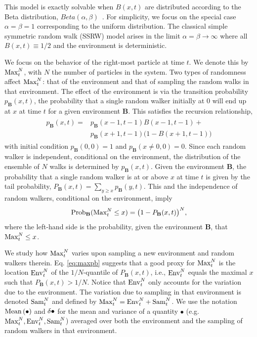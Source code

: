 This model is exactly solvable when $B(x,t)$ are distributed according to the Beta distribution, $Beta(\alpha, \beta)$~\cite{barraquandRandomwalkBetadistributedRandom2017a}. For simplicity, we focus on the special case $\alpha=\beta=1$ corresponding to the uniform distribution. The classical simple symmetric random walk (SSRW) model arises in the limit $\alpha=\beta\to \infty$ where all $B(x,t)\equiv 1/2$ and the environment is deterministic.

We focus on the behavior of the right-most particle at time $t$. We denote this by $\mathrm{Max}^{N}_t$, with $N$ the number of particles in the system. Two types of randomness affect $\mathrm{Max}^{N}_t$: that of the environment and that of sampling the random walks in that environment. The effect of the environment is via the transition probability $p_{\mathbf{B}}(x,t)$, the probability that a single random walker initially at $0$ will end up at $x$ at time $t$ for a given environment $\mathbf{B}$. This satisfies the recursion relationship, %
%
\begin{align} \label{eq:kolmogorov}
 \begin{split}
  p_{\mathbf{B}}(x,t) = & p_{\mathbf{B}}(x-1,t-1)B(x-1,t-1) +\\
  & p_{\mathbf{B}}(x+1,t-1)\big(1-B(x+1,t-1)\big)
 \end{split}
\end{align}
%
with initial condition $p_{\mathbf{B}}(0,0) = 1$ and $p_{\mathbf{B}}(x \neq 0,0) = 0$. Since each random walker is independent, conditional on the environment, the distribution of the ensemble of $N$ walks is determined by $p_{\mathbf{B}}(x,t)$. Given the environment $\mathbf{B}$, the probability that a single random walker is at or above $x$ at time $t$ is given by the tail probability, $P_{\mathbf{B}}(x,t) = \sum_{y\geq x} p_{\mathbf{B}}(y,t)$. This and the independence of random walkers, conditional on the environment, imply
%
\begin{equation}\label{eq:maxpb}
\mathrm{Prob}_{\mathbf{B}}(\mathrm{Max}^{N}_t \leq x) = \big(1-P_{\mathbf{B}}(x,t)\big)^N,
\end{equation}
%
where the left-hand side is the probability, given the environment $\mathbf{B}$, that $\mathrm{Max}^{N}_t \leq x$.

We study how $\mathrm{Max}^{N}_t$ varies upon sampling a new environment and random walkers therein. Eq. \eqref{eq:maxpb} suggests that a good proxy for $\mathrm{Max}^{N}_t$ is the location $\mathrm{Env}^{N}_t$ of the $1/N$-quantile of $P_{\mathbf{B}}(x,t)$, i.e., $\mathrm{Env}^{N}_t$ equals the maximal $x$ such that $P_{\mathbf{B}}(x,t)>1/N$. Notice that $\mathrm{Env}^{N}_t$ only accounts for the variation due to the environment. The variation due to sampling in that environment is denoted $\mathrm{Sam}^{N}_t$ and defined by $\mathrm{Max}^{N}_t = \mathrm{Env}^{N}_t + \mathrm{Sam}^{N}_t$. We use the notation $\mathrm{Mean}\left(\bullet\right)$ and $\var{\bullet}$ for the mean and variance of a quantity $\bullet$ (e.g. $\mathrm{Max}^{N}_t, \mathrm{Env}^{N}_t,\mathrm{Sam}^{N}_t$) averaged over both the environment and the sampling of random walkers in that environment.

